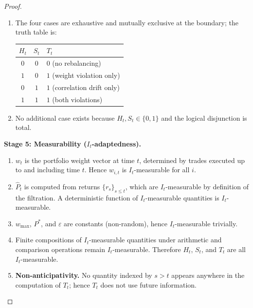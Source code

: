 \documentclass[12pt,openany]{book}
\newcommand{\bfw}{\mathbf{w}}
\numberwithin{equation}{chapter}
\theoremstyle{plain}
\theoremstyle{definition}
\theoremstyle{remark}
\def\mathcal#1{#1}%
\def\bfw{w}%
\begin{document}
\begin{proof}
\begin{enumerate}
  \item The four cases are exhaustive and mutually exclusive
        at the boundary; the truth table is:
        \begin{center}
        \begin{tabular}{ccl}
          \hline
          $H_t$ & $S_t$ & $T_t$ \\
          \hline
          $0$ & $0$ & $0$ \quad (no rebalancing) \\
          $1$ & $0$ & $1$ \quad (weight violation only) \\
          $0$ & $1$ & $1$ \quad (correlation drift only) \\
          $1$ & $1$ & $1$ \quad (both violations) \\
          \hline
        \end{tabular}
        \end{center}

  \item No additional case exists because $H_t, S_t \in \{0,1\}$
        and the logical disjunction is total.
\end{enumerate}

\medskip
\noindent\textbf{Stage 5: Measurability ($\mathcal{I}_t$-adaptedness).}
\begin{enumerate}
  \item $\bfw_t$ is the portfolio weight vector at time $t$,
        determined by trades executed up to and including time $t$.
        Hence $w_{i,t}$ is $\mathcal{I}_t$-measurable for all $i$.

  \item $\hat{P}_t$ is computed from returns
        $\{r_s\}_{s \leq t}$, which are $\mathcal{I}_t$-measurable by
        definition of the filtration.  A deterministic function of
        $\mathcal{I}_t$-measurable quantities is $\mathcal{I}_t$-measurable.

  \item $w_{\max}$, $P^*$, and $\varepsilon$ are constants
        (non-random), hence $\mathcal{I}_t$-measurable trivially.

  \item Finite compositions of $\mathcal{I}_t$-measurable quantities
        under arithmetic and comparison operations remain
        $\mathcal{I}_t$-measurable.  Therefore $H_t$, $S_t$, and
        $T_t$ are all $\mathcal{I}_t$-measurable.

  \item \textbf{Non-anticipativity.}
        No quantity indexed by $s > t$ appears anywhere in the
        computation of $T_t$; hence $T_t$ does not use future
        information.
\end{enumerate}


\end{proof}
\end{document}
